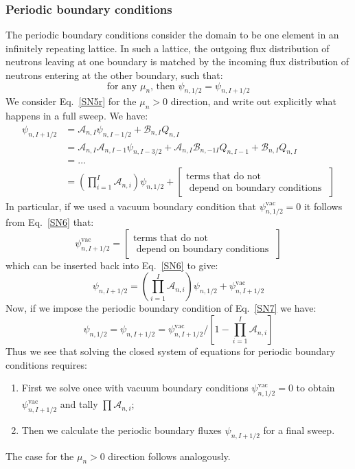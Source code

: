 \documentclass{article}
\begin{document}
\subsubsection{Periodic boundary conditions}
The periodic boundary conditions consider the domain to be one element in an infinitely repeating lattice. In such a lattice, the outgoing flux distribution of neutrons leaving at one boundary is matched by the incoming flux distribution of neutrons entering at the other boundary, such that:
\begin{equation}\label{SN7}
    \text{for any }\mu_n\text{, then }\psi_{n,1/2}=\psi_{n,I+1/2}
\end{equation}
We consider Eq.~\eqref{SN5r} for the $\mu_n>0$ direction, and write out explicitly what happens in a full sweep. We have:
\begin{align}
    \psi_{n,I+1/2}&=\mathcal{A}_{n,I}\psi_{n,I-1/2}+\mathcal{B}_{n,I}Q_{n,I}\\
    &=\mathcal{A}_{n,I}\mathcal{A}_{n,I-1}\psi_{n,I-3/2}+\mathcal{A}_{n,I}\mathcal{B}_{n,-1I}Q_{n,I-1}+\mathcal{B}_{n,I}Q_{n,I} \\
    &=\dots \nonumber \\
    &=\left(\prod_{i=1}^I\mathcal{A}_{n,i}\right)\psi_{n,1/2}+
    \begin{bmatrix}
        \text{terms that do not} \\
        \text{ depend on boundary conditions }
    \end{bmatrix} \label{SN6}
\end{align}
In particular, if we used a vacuum boundary condition that $\psi^\text{vac}_{n,1/2}=0$ it follows from Eq.~\eqref{SN6} that:
\begin{equation}
    \psi^\text{vac}_{n,I+1/2}=
    \begin{bmatrix}
        \text{terms that do not} \\
        \text{ depend on boundary conditions }
    \end{bmatrix}
\end{equation}
which can be inserted back into Eq.~\eqref{SN6} to give:
\begin{equation}
    \psi_{n,I+1/2}=\left(\prod_{i=1}^I\mathcal{A}_{n,i}\right)\psi_{n,1/2}+\psi^\text{vac}_{n,I+1/2}
\end{equation}
Now, if we impose the periodic boundary condition of Eq.~\ref{SN7} we have:
\begin{equation}
    \psi_{n,1/2}=\psi_{n,I+1/2}=\psi^\text{vac}_{n,I+1/2}\bigg/\left[1-\prod_{i=1}^I\mathcal{A}_{n,i}\right]
\end{equation}
Thus we see that solving the closed system of equations for periodic boundary conditions requires:
\begin{enumerate}
    \item First we solve once with vacuum boundary conditions $\psi^\text{vac}_{n,1/2}=0$ to obtain $\psi^\text{vac}_{n,I+1/2}$ and tally $\prod\mathcal{A}_{n,i}$;
    \item Then we calculate the periodic boundary fluxes $\psi_{n,I+1/2}$ for a final sweep.
\end{enumerate}
The case for the $\mu_n>0$ direction follows analogously.
\end{document}
